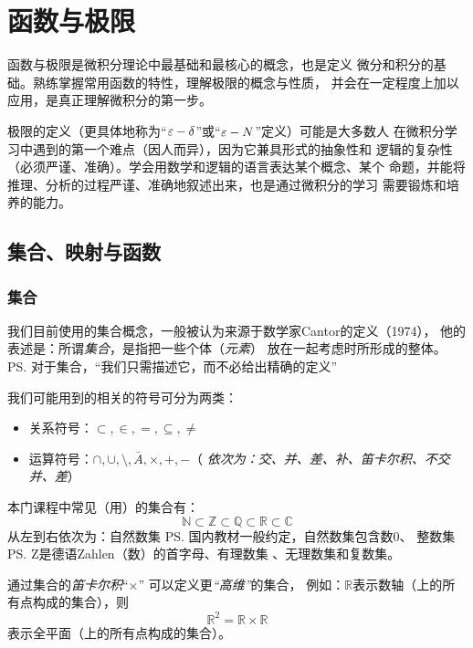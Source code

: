 
\setcounter{theExample}{1}

\chapter{函数与极限}

函数与极限是微积分理论中最基础和最核心的概念，也是定义
微分和积分的基础。熟练掌握常用函数的特性，理解极限的概念与性质，
并会在一定程度上加以应用，是真正理解微积分的第一步。

极限的定义（更具体地称为“$\varepsilon-\delta$”或“$\varepsilon-N$”定义）可能是大多数人
在微积分学习中遇到的第一个难点（因人而异），因为它兼具形式的抽象性和
逻辑的复杂性（必须严谨、准确）。学会用数学和逻辑的语言表达某个概念、某个
命题，并能将推理、分析的过程严谨、准确地叙述出来，也是通过微积分的学习
需要锻炼和培养的能力。

\section{集合、映射与函数}

\subsection{集合}

我们目前使用的集合概念，一般被认为来源于数学家Cantor的定义（1974），
他的表述是：所谓{\it 集合}，是指把一些个体（{\it 元素}） 
放在一起考虑时所形成的整体。
\ps{对于集合，“我们只需描述它，而不必给出精确的定义”}

我们可能用到的相关的符号可分为两类：
\begin{itemize}
  \item 关系符号：$\subset, \in, =, \subseteq, \neq$
  \item 运算符号：$\cap,\cup, \setminus, \bar{A}, \times, +, - $\quad （{\it
  依次为：交、并、差、补、笛卡尔积、不交并、差}）
\end{itemize}
	
本门课程中常见（用）的集合有：
$$\mathbb{N}\subset\mathbb{Z}\subset\mathbb{Q}
\subset\mathbb{R}\subset\mathbb{C}$$
从左到右依次为：{\kaishu 自然数集}
\ps{\vspace{-1cm}国内教材一般约定，自然数集包含数$0$}、
{\kaishu 整数集}\ps{Z是德语Zahlen（数）的首字母}、{\kaishu 有理数集}
、{\kaishu 无理数集}和{\kaishu 复数集}。

通过集合的{\it 笛卡尔积}“$\times$” 可以定义更{\it“高维”}的集合，
例如：$\mathbb{R}$表示数轴（上的所有点构成的集合），则
$$\mathbb{R}^2=\mathbb{R}\times\mathbb{R}$$
表示全平面（上的所有点构成的集合）。


